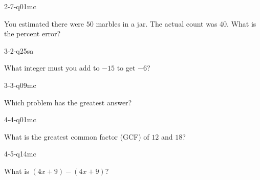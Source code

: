 \begin{practiceQuestion}{2-7-q01}{mc}
\begin{questionText}
You estimated there were $50$ marbles in a jar. The actual count was $40$. What is the percent error?
\end{questionText}
\end{practiceQuestion}

\begin{practiceQuestion}{3-2-q25}{sa}
\begin{questionText}
What integer must you add to $-15$ to get $-6$?
\end{questionText}
\end{practiceQuestion}

\begin{practiceQuestion}{3-3-q09}{mc}
\begin{questionText}
Which problem has the greatest answer?
\end{questionText}
\end{practiceQuestion}

\begin{practiceQuestion}{4-4-q01}{mc}
\begin{questionText}
What is the greatest common factor (GCF) of $12$ and $18$?
\end{questionText}
\end{practiceQuestion}

\begin{practiceQuestion}{4-5-q14}{mc}
\begin{questionText}
What is $(4x + 9) - (4x + 9)$?
\end{questionText}
\end{practiceQuestion}

